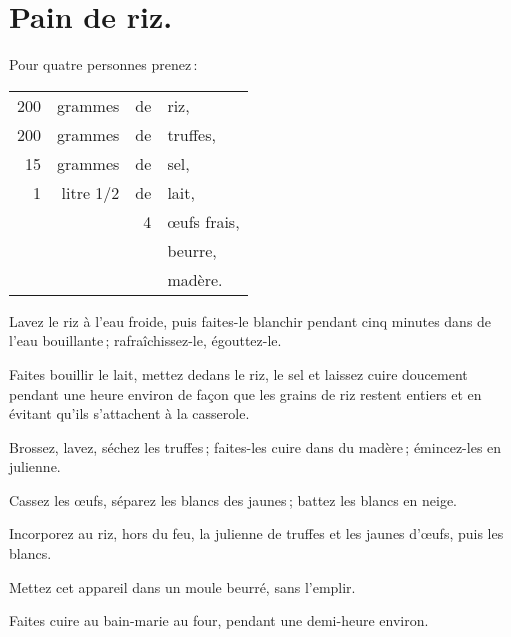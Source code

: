 \section*{\centering Pain de riz.}
{}

Pour quatre personnes prenez :

\footnotesize
\begin{longtable}{rrrp{16em}}
    200 & grammes & de & riz,                                                                             \\
    200 & grammes & de & truffes,                                                                         \\
     15 & grammes & de & sel,                                                                             \\
    1 & litre 1/2 & de & lait,                                                                            \\
        &         &  4 & œufs frais,                                                                      \\
        &         &    & beurre,                                                                          \\
        &         &    & madère.                                                                          \\
\end{longtable}
\normalsize

Lavez le riz à l'eau froide, puis faites-le blanchir pendant cinq minutes dans
de l'eau bouillante ; rafraîchissez-le, égouttez-le.

Faites bouillir le lait, mettez dedans le riz, le sel et laissez cuire
doucement pendant une heure environ de façon que les grains de riz restent
entiers et en évitant qu'ils s'attachent à la casserole.

Brossez, lavez, séchez les truffes ; faites-les cuire dans du madère ;
émincez-les en julienne.

Cassez les œufs, séparez les blancs des jaunes ; battez les blancs en neige.

Incorporez au riz, hors du feu, la julienne de truffes et les jaunes d'œufs, puis
les blancs.

Mettez cet appareil dans un moule beurré, sans l'emplir.

Faites cuire au bain-marie au four, pendant une demi-heure environ.

